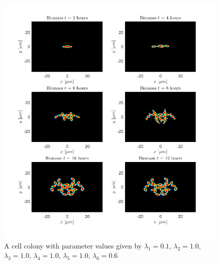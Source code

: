 \begin{figure}[h] %
    \centering
    \includegraphics[width= 1\textwidth]{
        chapter2/figures/Biomass_t_all_L1_0o10_L2_1o00_L3_1o00_L4_1o00_L5_1o00_L6_3o00_L7_0o60.png}
    \caption{A cell colony with parameter values given by
             $\lambda_1 = 0.1$,  
             $\lambda_2 = 1.0$, 
             $\lambda_3 = 1.0$, 
             $\lambda_4 = 1.0$, 
             $\lambda_5 = 1.0$, 
             $\lambda_6 = 0.6$}
    \label{fig:ColonySimulationNutrientFieldN210}
    \end{figure}
    \filbreak











